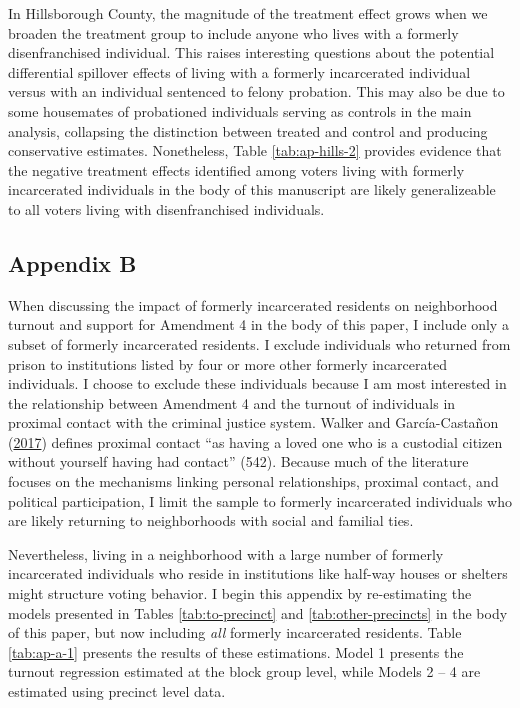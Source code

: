 \documentclass[
  12pt,
]{article}
\begin{document}
\begin{singlespace}

\end{singlespace}

In Hillsborough County, the magnitude of the treatment effect grows when we broaden the treatment group to include anyone who lives with a formerly disenfranchised individual. This raises interesting questions about the potential differential spillover effects of living with a formerly incarcerated individual versus with an individual sentenced to felony probation. This may also be due to some housemates of probationed individuals serving as controls in the main analysis, collapsing the distinction between treated and control and producing conservative estimates. Nonetheless, Table \ref{tab:ap-hills-2} provides evidence that the negative treatment effects identified among voters living with formerly incarcerated individuals in the body of this manuscript are likely generalizeable to all voters living with disenfranchised individuals.

\newpage

\hypertarget{appendix-b}{%
\subsection*{Appendix B}\label{appendix-b}}

When discussing the impact of formerly incarcerated residents on neighborhood turnout and support for Amendment 4 in the body of this paper, I include only a subset of formerly incarcerated residents. I exclude individuals who returned from prison to institutions listed by four or more other formerly incarcerated individuals. I choose to exclude these individuals because I am most interested in the relationship between Amendment 4 and the turnout of individuals in proximal contact with the criminal justice system. Walker and García-Castañon (\protect\hyperlink{ref-Walker2017}{2017}) defines proximal contact ``as having a loved one who is a custodial citizen without yourself having had contact'' (542). Because much of the literature focuses on the mechanisms linking personal relationships, proximal contact, and political participation, I limit the sample to formerly incarcerated individuals who are likely returning to neighborhoods with social and familial ties.

Nevertheless, living in a neighborhood with a large number of formerly incarcerated individuals who reside in institutions like half-way houses or shelters might structure voting behavior. I begin this appendix by re-estimating the models presented in Tables \ref{tab:to-precinct} and \ref{tab:other-precincts} in the body of this paper, but now including \emph{all} formerly incarcerated residents. Table \ref{tab:ap-a-1} presents the results of these estimations. Model 1 presents the turnout regression estimated at the block group level, while Models 2 -- 4 are estimated using precinct level data.
\end{document}
